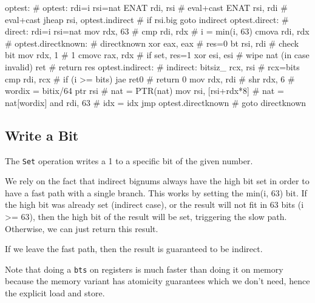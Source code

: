 \begin{asm}
optest:                                      # optest: rdi=i rsi=nat
	ENAT	rdi, rsi                     #   eval+cast
	ENAT	rsi, rdi                     #   eval+cast
	jheap	rsi, optest.indirect         #   if rsi.big goto indirect
optest.direct:                               # direct: rdi=i rsi=nat
	mov	rdx, 63                      #
	cmp	rdi, rdx                     #   i = min(i, 63)
	cmova	rdi, rdx                     #
optest.directknown:                          # directknown
	xor	eax, eax                     #   res=0
	bt	rsi, rdi                     #   check bit
	mov	rdx, 1                       #   1
	cmovc	rax, rdx                     #   if set, res=1
	xor	esi, esi                     #   wipe nat (in case invalid)
	ret                                  #   return res
optest.indirect:                             # indirect:
	bitsiz_	rcx, rsi                     #   rcx=bits
	cmp	rdi, rcx                     #   if (i >= bits)
	jae	ret0                         #     return 0
	mov	rdx, rdi                     #
	shr	rdx, 6                       #   wordix = bitix/64
	ptr	rsi                          #   nat = PTR(nat)
	mov	rsi, [rsi+rdx*8]             #   nat = nat[wordix]
	and	rdi, 63                      #   idx = idx %
	jmp	optest.directknown           #   goto directknown
\end{asm}

\subsection{Write a Bit}

The \lstinline|Set| operation writes a 1 to a specific bit of the
given number.

We rely on the fact that indirect bignums always have the high bit set in
order to have a fast path with a single branch.  This works by setting
the min(i, 63) bit.  If the high bit was already set (indirect case),
or the result will not fit in 63 bits (i >= 63), then the high bit of
the result will be set, triggering the slow path.  Otherwise, we can just
return this result.

If we leave the fast path, then the result is guaranteed to be indirect.

Note that doing a \lstinline|bts| on registers is much faster than
doing it on memory because the memory variant has atomicity guarantees
which we don't need, hence the explicit load and store.

